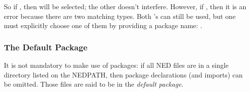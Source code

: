 So if , then
 will be selected; the other
 doesn't interfere. However, if
, then it is an error because there are two
matching  types. Both 's can still be used,
but one must explicitly choose one of them by providing a package name:
.


\subsubsection{The Default Package}

It is not mandatory to make use of packages: if all NED files are in a
single directory listed on the NEDPATH, then package declarations (and
imports) can be omitted. Those files are said to be in the \textit{default
package}.






